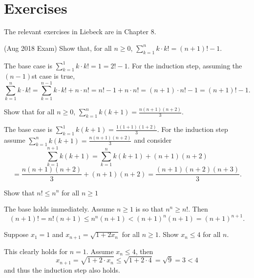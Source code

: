 \documentclass[11pt,dvipsnames]{book}
\numberwithin{figure}{section} %
\numberwithin{table}{section} %
\begin{document}
\section{Exercises}%
\label{inductionexercises}

The relevant exercises in Liebeck are in Chapter 8.

\begin{exercise}
(Aug 2018 Exam) Show that, for all $n\geq 0$, $\sum_{k=1}^{n} k\cdot k! = (n+1)!-1$.
\begin{solution}
The base case is $\sum_{k=1}^{1} k\cdot k!=1=2!-1$. For the induction step, assuming the $(n-1)$st case is true,
\[
\sum_{k=1}^{n} k\cdot k!
=\sum_{k=1}^{n-1} k\cdot k! + n\cdot n!
=n!-1+ n\cdot n!
=(n+1)\cdot n! -1 = (n+1)!-1.
\]
\end{solution}
\end{exercise}

\begin{exercise}
Show that for all $n\geq 0$, $\sum_{k=1}^{n} k(k+1) = \frac{n(n+1)(n+2)}{3}$.
\begin{solution}
The base case is $\sum_{k=1}^{1} k(k+1) = \frac{1(1+1)(1+2)}{3}$.
For the induction step assume $\sum_{k=1}^{n} k(k+1) = \frac{n(n+1)(n+2)}{3}$ and consider
\[
\sum_{k=1}^{n+1} k(k+1) =
\sum_{k=1}^{n} k(k+1) +(n+1)(n+2) \]
\[
= \frac{n(n+1)(n+2)}{3}+(n+1)(n+2)
=\frac{(n+1)(n+2)(n+3)}{3}.
\]
\end{solution}
\end{exercise}

\begin{exercise}
Show that $n!\leq n^{n}$ for all $n\geq 1$
\begin{solution}
The base holds immediately. Assume $n\geq 1$ is so that $n^{n}\geq n!$. Then
\[
(n+1)!=n! (n+1)\leq n^{n} (n+1)<(n+1)^{n}(n+1)=(n+1)^{n+1}.
\]
\end{solution}
\end{exercise}

\begin{exercise} Suppose $x_{1}=1$ and $x_{n+1} = \sqrt{1+2x_{n}}$ for all $n\geq 1$. Show $x_{n}\leq 4$ for all $n$. \\
\begin{solution}
This clearly holds for $n=1$. Assume $x_{n}\leq 4$, then
\[
x_{n+1}= \sqrt{1+2\cdot x_{n}}\leq \sqrt{1+2\cdot 4}=\sqrt{9}=3<4\]
and thus the induction step also holds.
\end{solution}
\end{exercise}
\end{document}
